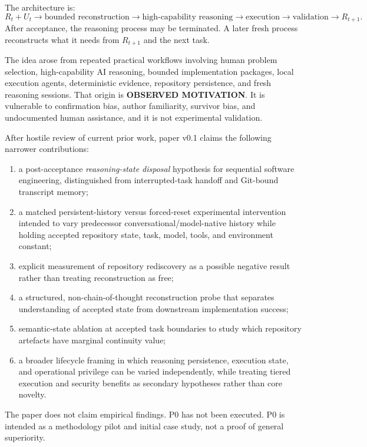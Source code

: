 The architecture is:
\[
R_t + U_t
\rightarrow
\text{bounded reconstruction}
\rightarrow
\text{high-capability reasoning}
\rightarrow
\text{execution}
\rightarrow
\text{validation}
\rightarrow
R_{t+1}.
\]
After acceptance, the reasoning process may be terminated. A later fresh process reconstructs what it needs from $R_{t+1}$ and the next task.

The idea arose from repeated practical workflows involving human problem selection, high-capability AI reasoning, bounded implementation packages, local execution agents, deterministic evidence, repository persistence, and fresh reasoning sessions. That origin is \textbf{OBSERVED MOTIVATION}. It is vulnerable to confirmation bias, author familiarity, survivor bias, and undocumented human assistance, and it is not experimental validation.

After hostile review of current prior work, paper v0.1 claims the following narrower contributions:

\begin{enumerate}
    \item a post-acceptance \emph{reasoning-state disposal} hypothesis for sequential software engineering, distinguished from interrupted-task handoff and Git-bound transcript memory;
    \item a matched persistent-history versus forced-reset experimental intervention intended to vary predecessor conversational/model-native history while holding accepted repository state, task, model, tools, and environment constant;
    \item explicit measurement of repository rediscovery as a possible negative result rather than treating reconstruction as free;
    \item a structured, non-chain-of-thought reconstruction probe that separates understanding of accepted state from downstream implementation success;
    \item semantic-state ablation at accepted task boundaries to study which repository artefacts have marginal continuity value;
    \item a broader lifecycle framing in which reasoning persistence, execution state, and operational privilege can be varied independently, while treating tiered execution and security benefits as secondary hypotheses rather than core novelty.
\end{enumerate}

The paper does not claim empirical findings. P0 has not been executed. P0 is intended as a methodology pilot and initial case study, not a proof of general superiority.
